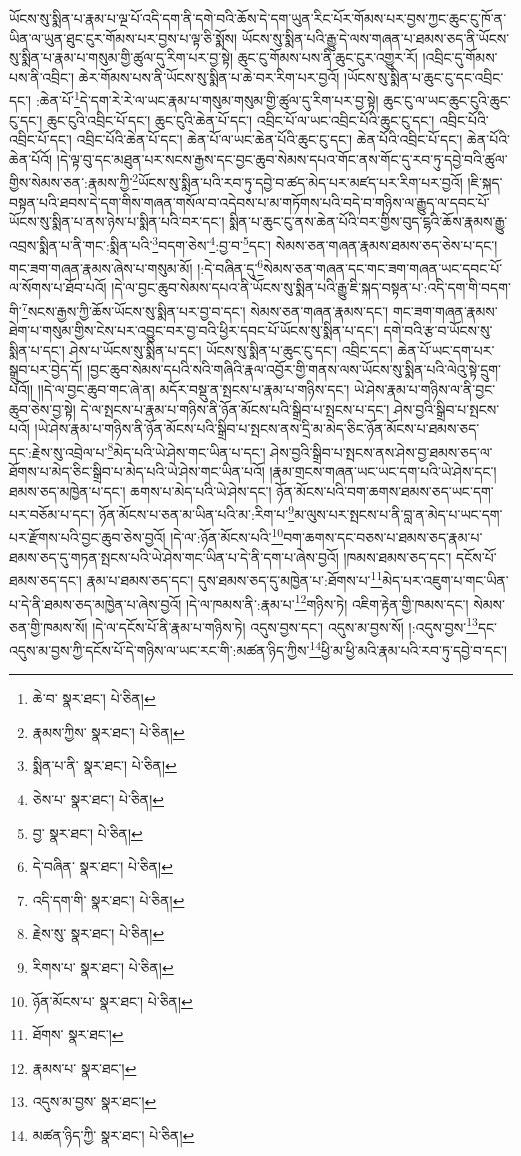 ཡོངས་སུ་སྨིན་པ་རྣམ་པ་ལྔ་པོ་འདི་དག་ནི་དགེ་བའི་ཆོས་དེ་དག་ཡུན་རིང་པོར་གོམས་པར་བྱས་ཀྱང་ཆུང་ངུ་ཁོ་ན་ཡིན་ལ་ཡུན་ཐུང་ངུར་གོམས་པར་བྱས་པ་ལྟ་ཅི་སྨོས། ཡོངས་སུ་སྨིན་པའི་རྒྱུ་དེ་ལས་གཞན་པ་ཐམས་ཅད་ནི་ཡོངས་སུ་སྨིན་པ་རྣམ་པ་གསུམ་གྱི་ཚུལ་དུ་རིག་པར་བྱ་སྟེ། ཆུང་ངུ་གོམས་པས་ནི་ཆུང་ངུར་འགྱུར་རོ། །འབྲིང་དུ་གོམས་པས་ནི་འབྲིང་། ཆེར་གོམས་པས་ནི་ཡོངས་སུ་སྨིན་པ་ཆེ་བར་རིག་པར་བྱའོ། །ཡོངས་སུ་སྨིན་པ་ཆུང་ངུ་དང་འབྲིང་དང་། :ཆེན་པོ་\footnote{ཆེ་བ་  སྣར་ཐང་།  པེ་ཅིན། }དེ་དག་རེ་རེ་ལ་ཡང་རྣམ་པ་གསུམ་གསུམ་གྱི་ཚུལ་དུ་རིག་པར་བྱ་སྟེ། ཆུང་ངུ་ལ་ཡང་ཆུང་ངུའི་ཆུང་ངུ་དང་། ཆུང་ངུའི་འབྲིང་པོ་དང་། ཆུང་ངུའི་ཆེན་པོ་དང་། འབྲིང་པོ་ལ་ཡང་འབྲིང་པོའི་ཆུང་ངུ་དང་། འབྲིང་པོའི་འབྲིང་པོ་དང་། འབྲིང་པོའི་ཆེན་པོ་དང་། ཆེན་པོ་ལ་ཡང་ཆེན་པོའི་ཆུང་ངུ་དང་། ཆེན་པོའི་འབྲིང་པོ་དང་། ཆེན་པོའི་ཆེན་པོའོ། །དེ་ལྟ་བུ་དང་མཐུན་པར་སངས་རྒྱས་དང་བྱང་ཆུབ་སེམས་དཔའ་གོང་ནས་གོང་དུ་རབ་ཏུ་དབྱེ་བའི་ཚུལ་གྱིས་སེམས་ཅན་:རྣམས་ཀྱི་\footnote{རྣམས་ཀྱིས་  སྣར་ཐང་།  པེ་ཅིན། }ཡོངས་སུ་སྨིན་པའི་རབ་ཏུ་དབྱེ་བ་ཚད་མེད་པར་མཛད་པར་རིག་པར་བྱའོ། །ཇི་སྐད་བསྟན་པའི་ཐབས་དེ་དག་གིས་གཞན་གསོལ་བ་འདེབས་པ་མ་གཏོགས་པའི་བདེ་བ་གཉིས་ལ་རྒྱུད་ལ་དབང་པོ་ཡོངས་སུ་སྨིན་པ་ནས་ཉེས་པ་སྨིན་པའི་བར་དང་། སྨིན་པ་ཆུང་ངུ་ནས་ཆེན་པོའི་བར་གྱིས་བུད་ངྷའི་ཆོས་རྣམས་རྒྱུ་འབྲས་སྨིན་པ་ནི་གང་:སྨིན་པའི་\footnote{སྨིན་པ་ནི་  སྣར་ཐང་།  པེ་ཅིན། }བདག་ཅེས་\footnote{ཅེས་པ་  སྣར་ཐང་།  པེ་ཅིན། }:བྱ་བ་\footnote{བྱ་  སྣར་ཐང་།  པེ་ཅིན། }དང་། སེམས་ཅན་གཞན་རྣམས་ཐམས་ཅད་ཅེས་པ་དང་། གང་ཟག་གཞན་རྣམས་ཞེས་པ་གསུམ་མོ། །:དེ་བཞིན་དུ་\footnote{དེ་བཞིན་  སྣར་ཐང་།  པེ་ཅིན། }སེམས་ཅན་གཞན་དང་གང་ཟག་གཞན་ཡང་དབང་པོ་ལ་སོགས་པ་ཐོབ་པའོ། །དེ་ལ་བྱང་ཆུབ་སེམས་དཔའ་ནི་ཡོངས་སུ་སྨིན་པའི་རྒྱུ་ཇི་སྐད་བསྟན་པ་:འདི་དག་གི་བདག་གི་\footnote{འདི་དག་གི་  སྣར་ཐང་།  པེ་ཅིན། }སངས་རྒྱས་ཀྱི་ཆོས་ཡོངས་སུ་སྨིན་པར་བྱ་བ་དང་། སེམས་ཅན་གཞན་རྣམས་དང་། གང་ཟག་གཞན་རྣམས་ཐེག་པ་གསུམ་གྱིས་ངེས་པར་འབྱུང་བར་བྱ་བའི་ཕྱིར་དབང་པོ་ཡོངས་སུ་སྨིན་པ་དང་། དགེ་བའི་རྩ་བ་ཡོངས་སུ་སྨིན་པ་དང་། ཤེས་པ་ཡོངས་སུ་སྨིན་པ་དང་། ཡོངས་སུ་སྨིན་པ་ཆུང་ངུ་དང་། འབྲིང་དང་། ཆེན་པོ་ཡང་དག་པར་སྒྲུབ་པར་བྱེད་དོ། །བྱང་ཆུབ་སེམས་དཔའི་སའི་གཞིའི་རྣལ་འབྱོར་གྱི་གནས་ལས་ཡོངས་སུ་སྨིན་པའི་ལེའུ་སྟེ་དྲུག་པའོ།། །།དེ་ལ་བྱང་ཆུབ་གང་ཞེ་ན། མདོར་བསྡུ་ན་སྤངས་པ་རྣམ་པ་གཉིས་དང་། ཡེ་ཤེས་རྣམ་པ་གཉིས་ལ་ནི་བྱང་ཆུབ་ཅེས་བྱ་སྟེ། དེ་ལ་སྤངས་པ་རྣམ་པ་གཉིས་ནི་ཉོན་མོངས་པའི་སྒྲིབ་པ་སྤངས་པ་དང་། ཤེས་བྱའི་སྒྲིབ་པ་སྤངས་པའོ། །ཡེ་ཤེས་རྣམ་པ་གཉིས་ནི་ཉོན་མོངས་པའི་སྒྲིབ་པ་སྤངས་ནས་དྲི་མ་མེད་ཅིང་ཉོན་མོངས་པ་ཐམས་ཅད་དང་:རྗེས་སུ་འབྲེལ་པ་\footnote{རྗེས་སུ་  སྣར་ཐང་།  པེ་ཅིན། }མེད་པའི་ཡེ་ཤེས་གང་ཡིན་པ་དང་། ཤེས་བྱའི་སྒྲིབ་པ་སྤངས་ནས་ཤེས་བྱ་ཐམས་ཅད་ལ་ཐོགས་པ་མེད་ཅིང་སྒྲིབ་པ་མེད་པའི་ཡེ་ཤེས་གང་ཡིན་པའོ། །རྣམ་གྲངས་གཞན་ཡང་ཡང་དག་པའི་ཡེ་ཤེས་དང་། ཐམས་ཅད་མཁྱེན་པ་དང་། ཆགས་པ་མེད་པའི་ཡེ་ཤེས་དང་། ཉོན་མོངས་པའི་བག་ཆགས་ཐམས་ཅད་ཡང་དག་པར་བཅོམ་པ་དང་། ཉོན་མོངས་པ་ཅན་མ་ཡིན་པའི་མ་:རིག་པ་\footnote{རིགས་པ་  སྣར་ཐང་།  པེ་ཅིན། }མ་ལུས་པར་སྤངས་པ་ནི་བླ་ན་མེད་པ་ཡང་དག་པར་རྫོགས་པའི་བྱང་ཆུབ་ཅེས་བྱའོ། །དེ་ལ་:ཉོན་མོངས་པའི་\footnote{ཉོན་མོངས་པ་  སྣར་ཐང་།  པེ་ཅིན། }བག་ཆགས་དང་བཅས་པ་ཐམས་ཅད་རྣམ་པ་ཐམས་ཅད་དུ་གཏན་སྤངས་པའི་ཡེ་ཤེས་གང་ཡིན་པ་དེ་ནི་དག་པ་ཞེས་བྱའོ། །ཁམས་ཐམས་ཅད་དང་། དངོས་པོ་ཐམས་ཅད་དང་། རྣམ་པ་ཐམས་ཅད་དང་། དུས་ཐམས་ཅད་དུ་མཁྱེན་པ་:ཐོགས་པ་\footnote{ཐོགས་  སྣར་ཐང་། }མེད་པར་འཇུག་པ་གང་ཡིན་པ་དེ་ནི་ཐམས་ཅད་མཁྱེན་པ་ཞེས་བྱའོ། །དེ་ལ་ཁམས་ནི་:རྣམ་པ་\footnote{རྣམས་པ་  སྣར་ཐང་། }གཉིས་ཏེ། འཇིག་རྟེན་གྱི་ཁམས་དང་། སེམས་ཅན་གྱི་ཁམས་སོ། །དེ་ལ་དངོས་པོ་ནི་རྣམ་པ་གཉིས་ཏེ། འདུས་བྱས་དང་། འདུས་མ་བྱས་སོ། །:འདུས་བྱས་\footnote{འདུས་མ་བྱས་  སྣར་ཐང་། }དང་འདུས་མ་བྱས་ཀྱི་དངོས་པོ་དེ་གཉིས་ལ་ཡང་རང་གི་:མཚན་ཉིད་ཀྱིས་\footnote{མཚན་ཉིད་ཀྱི་  སྣར་ཐང་།  པེ་ཅིན། }ཕྱི་མ་ཕྱི་མའི་རྣམ་པའི་རབ་ཏུ་དབྱེ་བ་དང་། 